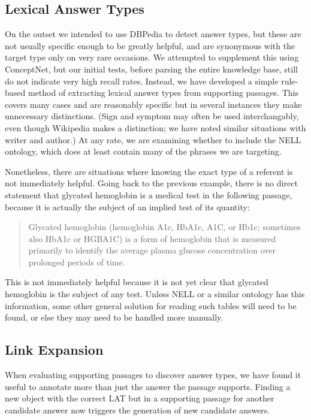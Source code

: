 \documentclass[12pt,letterpaper]{article}
\begin{document}
\subsection{Lexical Answer Types}
On the outset we intended to use DBPedia to detect answer types, but these are not usually specific enough to be greatly helpful, and are synonymous with the target type only on very rare occasions. We attempted to supplement this using ConceptNet, but our initial tests, before parsing the entire knowledge base, still do not indicate very high recall rates. Instead, we have developed a simple rule-based method of extracting lexical answer types from supporting passages. This covers many cases and are reasonably specific but in several instances they make unnecessary distinctions. (Sign and symptom may often be used interchangably, even though Wikipedia makes a distinction; we have noted similar situations with writer and author.) At any rate, we are examining whether to include the NELL ontology, which does at least contain many of the phrases we are targeting.

Nonetheless, there are situations where knowing the exact type of a referent is not immediately helpful. Going back to the previous example, there is no direct statement that glycated hemoglobin is a medical test in the following passage, because it is actually the subject of an implied test of its quantity:
\begin{quote}
Glycated hemoglobin (hemoglobin A1c, HbA1c, A1C, or Hb1c; sometimes also HbA1c or HGBA1C) is a form of hemoglobin that is measured primarily to identify the average plasma glucose concentration over prolonged periods of time.
\end{quote}
This is not immediately helpful because it is not yet clear that glycated hemoglobin is the subject of any test. Unless NELL or a similar ontology has this information, some other general solution for reading such tables will need to be found, or else they may need to be handled more manually.

\subsection{Link Expansion}
When evaluating supporting passages to discover answer types, we have found it useful to annotate more than just the answer the passage supports. Finding a new object with the correct LAT but in a supporting passage for another candidate answer now triggers the generation of new candidate answers.
\end{document}
